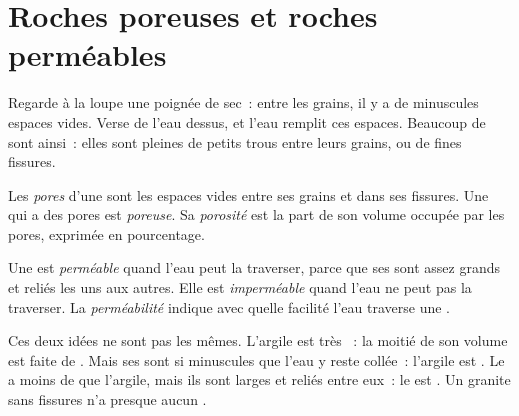 \section{Roches poreuses et roches perméables}

Regarde à la loupe une poignée de  sec~: entre les grains, il y a de
minuscules espaces vides. Verse de l'eau dessus, et l'eau remplit ces
espaces. Beaucoup de  sont ainsi~: elles sont pleines de petits trous
entre leurs grains, ou de fines fissures.

\begin{definition}[Porosité]\label{def:g6:water-underground:porosity}
Les \emph{pores} d'une  sont les espaces vides entre ses
grains et dans ses fissures. Une  qui a des pores est
\emph{poreuse}. Sa \emph{porosité}
est la part de son volume occupée par les pores, exprimée en pourcentage.
\end{definition}

\begin{definition}[Perméabilité]\label{def:g6:water-underground:permeability}
Une  est \emph{perméable} quand l'eau peut
la traverser, parce que ses  sont assez grands et reliés les uns aux
autres. Elle est \emph{imperméable} quand
l'eau ne peut pas la traverser. La
\emph{perméabilité} indique avec quelle
facilité l'eau traverse une .
\end{definition}

Ces deux idées ne sont pas les mêmes. L'argile est très ~: la
moitié de son volume est faite de . Mais ses  sont si minuscules
que l'eau y reste collée~: l'argile est \emph{}. Le  a
moins de  que l'argile, mais ils sont larges et reliés entre eux~: le
 est \emph{}. Un granite sans fissures n'a presque aucun
.

